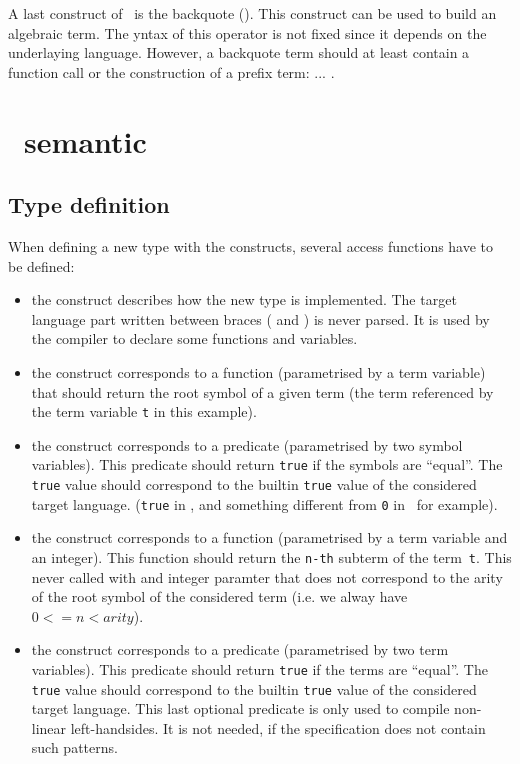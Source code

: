 A last construct of \TOM\ is the backquote (). This construct
can be used to build an algebraic term. The yntax of this operator is
not fixed since it depends on the underlaying language. However, a
backquote term should at least contain a function call or the
construction of a prefix term:   \lex{(} ... \lex{)}.


\section{\TOM\ semantic}

\subsection{Type definition}\label{typedef}

\noindent
When defining a new type with the  constructs,
several access functions have to be defined:
\begin{itemize}
\item\label{implement} the  construct describes how the new type is 
  implemented. The target language part written between braces
  ( and ) is never parsed. It is used by
  the compiler to declare some functions and variables.

\item\label{getfs} the  construct corresponds to a
  function (parametrised by a term variable) that should return the
  root symbol of a given term (the term referenced by the term
  variable \texttt{t} in this example). 

\item\label{cmpfs} the  construct corresponds to a
  predicate (parametrised by two symbol variables).
  This predicate should return \texttt{true} if the symbols are
  ``equal''. The \texttt{true} value should correspond to the 
  builtin \texttt{true} value of the considered target language.
  (\texttt{true} in \Java, and something different from \texttt{0} in
  \Clang\ for example). 

\item\label{getsub} the  construct corresponds to a
  function (parametrised by a term variable and an integer).
  This function should return the \texttt{n-th} subterm of the
  term~\texttt{t}. This never called with and integer paramter that
  does not correspond to the arity of the root symbol of the
  considered term (i.e. we alway have $0 <= n < arity$).

\item\label{equals} the  construct corresponds to a
  predicate (parametrised by two term variables).
  This predicate should return \texttt{true} if the terms are
  ``equal''. The \texttt{true} value should correspond to the 
  builtin \texttt{true} value of the considered target language.
  This last optional predicate is only used to compile non-linear 
  left-handsides. It is not needed, if the specification does not
  contain such patterns.
\end{itemize}


